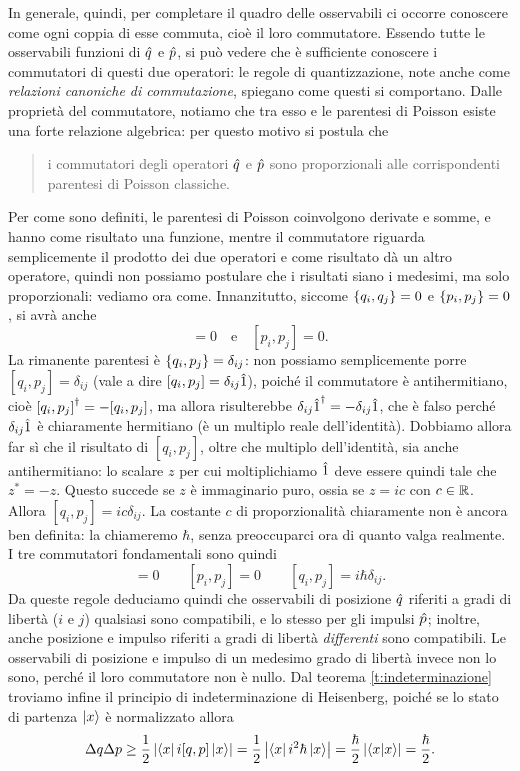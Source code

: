 In generale, quindi, per completare il quadro delle osservabili ci occorre conoscere come ogni coppia di esse commuta, cioè il loro commutatore.
Essendo tutte le osservabili funzioni di $\hat{q}$ e $\hat{p}$, si può vedere che è sufficiente conoscere i commutatori di questi due operatori: le regole di quantizzazione, note anche come \emph{relazioni canoniche di commutazione}, spiegano come questi si comportano.
Dalle proprietà del commutatore, notiamo che tra esso e le parentesi di Poisson esiste una forte relazione algebrica: per questo motivo si postula che
\begin{quote}
	i commutatori degli operatori $\hat{q}$ e $\hat{p}$ sono proporzionali alle corrispondenti parentesi di Poisson classiche.
\end{quote}
Per come sono definiti, le parentesi di Poisson coinvolgono derivate e somme, e hanno come risultato una funzione, mentre il commutatore riguarda semplicemente il prodotto dei due operatori e come risultato dà un altro operatore, quindi non possiamo postulare che i risultati siano i medesimi, ma solo proporzionali: vediamo ora come.
Innanzitutto, siccome $\left\{ {q_i},{q_j}\right\}=0$ e $\left\{ {p_i},{p_j}\right\}=0$, si avrà anche
\begin{equation}
	[q_i,q_j]=0\quad\text{e}\quad[p_i,p_j]=0.
\end{equation}
La rimanente parentesi è $\left\{ {q_i},{p_j}\right\}=\delta_{ij}$: non possiamo semplicemente porre $[q_i,p_j]=\delta_{ij}$ (vale a dire $[q_i,p_j]=\delta_{ij}\hat{1}$), poich\'e il commutatore è antihermitiano, cioè ${[q_i,p_j]}^\dagger=-[q_i,p_j]$, ma allora risulterebbe ${\delta_{ij}\hat{1}}^\dagger=-\delta_{ij}\hat{1}$, che è falso perch\'e $\delta_{ij}\hat{1}$ è chiaramente hermitiano (è un multiplo reale dell'identità).
Dobbiamo allora far s\`i che il risultato di $[q_i,p_j]$, oltre che multiplo dell'identità, sia anche antihermitiano: lo scalare $z$ per cui moltiplichiamo $\hat{1}$ deve essere quindi tale che $z^*=-z$.
Questo succede se $z$ è immaginario puro, ossia se $z=ic$ con $c\in\mathbb{R}$.
Allora $[q_i,p_j]=ic\delta_{ij}$.
La costante $c$ di proporzionalità chiaramente non è ancora ben definita: la chiameremo $\hbar$, senza preoccuparci ora di quanto valga realmente.
I tre commutatori fondamentali sono quindi
\begin{equation}
	[q_i,q_j]=0\qquad[p_i,p_j]=0\qquad[q_i,p_j]=i\hbar\delta_{ij}.
	\label{eq:commutatori-fondamentali}
\end{equation}
Da queste regole deduciamo quindi che osservabili di posizione $\hat{q}$ riferiti a gradi di libertà ($i$ e $j$) qualsiasi sono compatibili, e lo stesso per gli impulsi $\hat{p}$; inoltre, anche posizione e impulso riferiti a gradi di libertà \emph{differenti} sono compatibili.
Le osservabili di posizione e impulso di un medesimo grado di libertà invece non lo sono, perch\'e il loro commutatore non è nullo.
Dal teorema \ref{t:indeterminazione} troviamo infine il principio di indeterminazione di Heisenberg, poich\'e se lo stato di partenza $\left|{x}\right\rangle$ è normalizzato allora
\begin{equation}
	\Delta q\Delta p\geq\frac12\left|{\left\langle{x}\right|i[q,p]\left|{x}\right\rangle}\right|=\frac12\left|{\left\langle{x}\right|i^2\hbar\left|{x}\right\rangle}\right|=\frac{\hbar}2\left|{\left\langle{x}\middle|{x}\right\rangle}\right|=\frac{\hbar}2.
	\label{eq:indeterminazione-heisenberg}
\end{equation}

